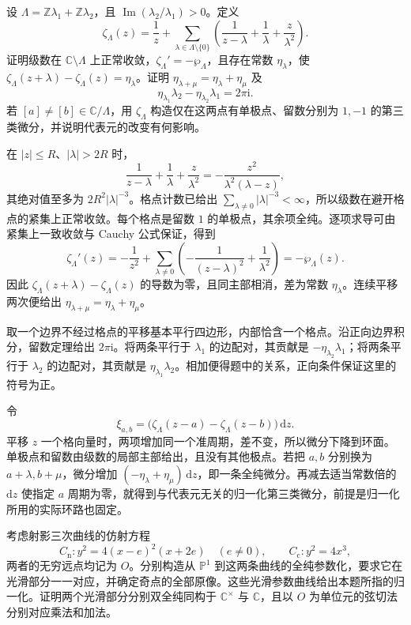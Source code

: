 \begin{exercise}
	\label{g4:ex:0405:zeta-quasiperiods}
	设 \(\Lambda=\mathbb Z\lambda_1+\mathbb Z\lambda_2\)，且 \(\operatorname{Im}(\lambda_2/\lambda_1)>0\)。定义
	\[
		\zeta_\Lambda(z)=\frac1z+
		\sum_{\lambda\in\Lambda\setminus\{0\}}
		\left(\frac1{z-\lambda}+\frac1\lambda+\frac z{\lambda^2}\right).
	\]
	证明级数在 \(\mathbb C\setminus\Lambda\) 上正常收敛，\(\zeta_\Lambda'=-\wp_\Lambda\)，且存在常数 \(\eta_\lambda\)，使 \(\zeta_\Lambda(z+\lambda)-\zeta_\Lambda(z)=\eta_\lambda\)。证明 \(\eta_{\lambda+\mu}=\eta_\lambda+\eta_\mu\) 及
	\[
		\eta_{\lambda_1}\lambda_2-\eta_{\lambda_2}\lambda_1=2\pi\mathrm{i}.
	\]
	若 \([a]\ne[b]\in\mathbb C/\Lambda\)，用 \(\zeta_\Lambda\) 构造仅在这两点有单极点、留数分别为 \(1,-1\) 的第三类微分，并说明代表元的改变有何影响。
\end{exercise}
\begin{solution}
	在 \(|z|\le R\)、\(|\lambda|>2R\) 时，
	\[
		\frac1{z-\lambda}+\frac1\lambda+\frac z{\lambda^2}
		=-\frac{z^2}{\lambda^2(\lambda-z)},
	\]
	其绝对值至多为 \(2R^2|\lambda|^{-3}\)。格点计数已给出 \(\sum_{\lambda\ne0}|\lambda|^{-3}<\infty\)，所以级数在避开格点的紧集上正常收敛。每个格点是留数 \(1\) 的单极点，其余项全纯。逐项求导可由紧集上一致收敛与 Cauchy 公式保证，得到
	\[
		\zeta_\Lambda'(z)=-\frac1{z^2}
		+\sum_{\lambda\ne0}\left(-\frac1{(z-\lambda)^2}
		+\frac1{\lambda^2}\right)=-\wp_\Lambda(z).
	\]
	因此 \(\zeta_\Lambda(z+\lambda)-\zeta_\Lambda(z)\) 的导数为零，且同主部相消，差为常数 \(\eta_\lambda\)。连续平移两次便给出 \(\eta_{\lambda+\mu}=\eta_\lambda+\eta_\mu\)。

	取一个边界不经过格点的平移基本平行四边形，内部恰含一个格点。沿正向边界积分，留数定理给出 \(2\pi\mathrm{i}\)。将两条平行于 \(\lambda_1\) 的边配对，其贡献是 \(-\eta_{\lambda_2}\lambda_1\)；将两条平行于 \(\lambda_2\) 的边配对，其贡献是 \(\eta_{\lambda_1}\lambda_2\)。相加便得题中的关系，正向条件保证这里的符号为正。

	令
	\[
		\xi_{a,b}
		=\bigl(\zeta_\Lambda(z-a)-\zeta_\Lambda(z-b)\bigr)\,\mathrm{d}z.
	\]
	平移 \(z\) 一个格向量时，两项增加同一个准周期，差不变，所以微分下降到环面。单极点和留数由级数的局部主部给出，且没有其他极点。若把 \(a,b\) 分别换为 \(a+\lambda,b+\mu\)，微分增加 \((-\eta_\lambda+\eta_\mu)\,\mathrm{d}z\)，即一条全纯微分。再减去适当常数倍的 \(\mathrm{d}z\) 使指定 \(a\) 周期为零，就得到与代表元无关的归一化第三类微分，前提是归一化所用的实际环路也固定。
\end{solution}
\begin{exercise}
	\label{g4:ex:0405:singular-group-laws}
	考虑射影三次曲线的仿射方程
	\[
		C_{\mathrm n}:y^2=4(x-e)^2(x+2e)\quad(e\ne0),\qquad
		C_{\mathrm c}:y^2=4x^3,
	\]
	两者的无穷远点均记为 \(O\)。分别构造从 \(\mathbb P^1\) 到这两条曲线的全纯参数化，要求它在光滑部分一一对应，并确定奇点的全部原像。这些光滑参数曲线给出本题所指的归一化。证明两个光滑部分分别双全纯同构于 \(\mathbb C^\times\) 与 \(\mathbb C\)，且以 \(O\) 为单位元的弦切法分别对应乘法和加法。
\end{exercise}
